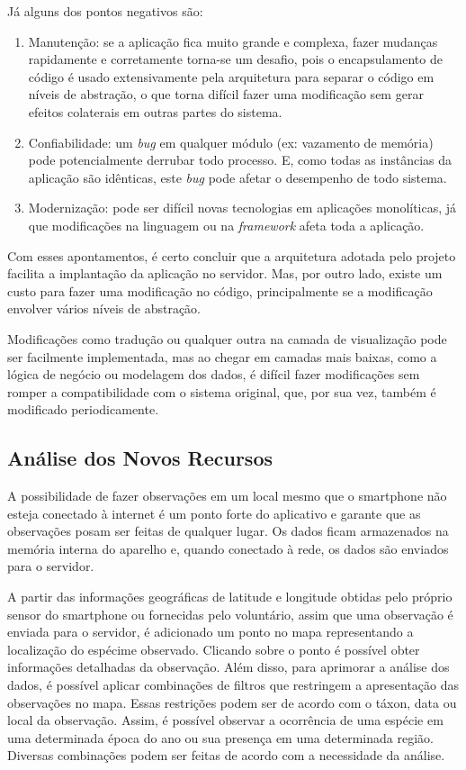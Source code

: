 Já alguns dos pontos negativos são:

\begin{enumerate}
  \item Manutenção: se a aplicação fica muito grande e complexa, fazer mudanças rapidamente e corretamente torna-se um desafio, pois o encapsulamento de código é usado extensivamente pela arquitetura para separar o código em níveis de abstração, o que torna difícil fazer uma modificação sem gerar efeitos colaterais em outras partes do sistema.
  \item Confiabilidade: um \emph{bug} em qualquer módulo (ex: vazamento de memória) pode potencialmente derrubar todo processo. E, como todas as instâncias da aplicação são idênticas, este \emph{bug} pode afetar o desempenho de todo sistema.
  \item Modernização: pode ser difícil novas tecnologias em aplicações monolíticas, já que modificações na linguagem ou na \emph{framework} afeta toda a aplicação.
\end{enumerate}

Com esses apontamentos, é certo concluir que a arquitetura adotada pelo projeto facilita a implantação da aplicação no servidor. Mas, por outro lado, existe um custo para fazer uma modificação no código, principalmente se a modificação envolver vários níveis de abstração.

Modificações como tradução ou qualquer outra na camada de visualização pode ser facilmente implementada, mas ao chegar em camadas mais baixas, como a lógica de negócio ou modelagem dos dados, é difícil fazer modificações sem romper a compatibilidade com o sistema original, que, por sua vez, também é modificado periodicamente.

\subsection{Análise dos Novos Recursos}

A possibilidade de fazer observações em um local mesmo que o smartphone não esteja conectado à internet é um ponto forte do aplicativo e garante que as observações posam ser feitas de qualquer lugar. Os dados ficam armazenados na memória interna do aparelho e, quando conectado à rede, os dados são enviados para o servidor.

A partir das informações geográficas de latitude e longitude obtidas pelo próprio sensor do smartphone ou fornecidas pelo voluntário, assim que uma observação é enviada para o servidor, é adicionado um ponto no mapa representando a localização do espécime observado. Clicando sobre o ponto é possível obter informações detalhadas da observação. Além disso, para aprimorar a análise dos dados, é possível aplicar combinações de filtros que restringem a apresentação das observações no mapa. Essas restrições podem ser de acordo com o táxon, data ou local da observação. Assim, é possível observar a ocorrência de uma espécie em uma determinada época do ano ou sua presença em uma determinada região. Diversas combinações podem ser feitas de acordo com a necessidade da análise.


